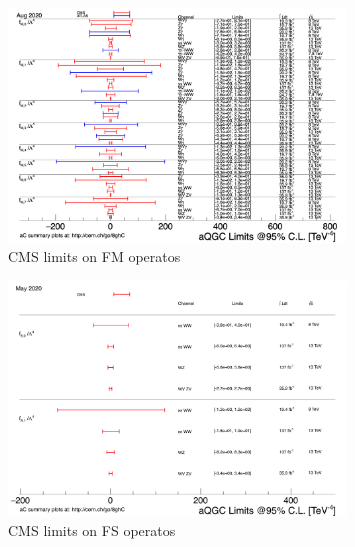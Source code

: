 \begin{figure}[tbp]
\begin{center}
 \includegraphics[width=0.80\textwidth,keepaspectratio]{figures/aQGC/aQGC_fm.png}
\caption{CMS limits on FM operatos}
\label{fig:limitFM}
\end{center}
\end{figure}

\begin{figure}[tbp]
\begin{center}
 \includegraphics[width=0.80\textwidth,keepaspectratio]{figures/aQGC/aQGC_fs.png}
\caption{CMS limits on FS operatos}
\label{fig:limitFS}
\end{center}
\end{figure}


